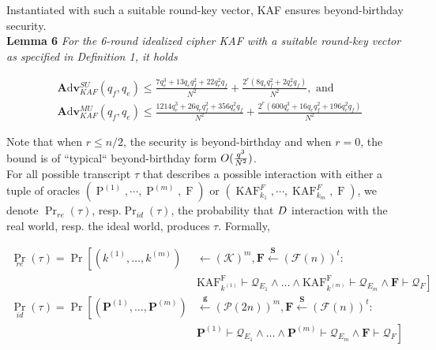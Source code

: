 Instantiated with such a suitable round-key vector, KAF ensures beyond-birthday security.\\

\noindent \textbf{Lemma 6} \emph{For the 6-round idealized cipher KAF with a suitable round-key vector as specified in Definition 1, it holds}

$$
\begin{aligned}
&\mathbf{A} \mathrm{d} \mathbf{v}_{K A F}^{S U}\left(q_{f}, q_{e}\right) \leq \frac{7 q_{e}^{3}+13 q_{e} q_{f}^{2}+22 q_{e}^{2} q_{f}}{N^{2}}+\frac{2^{r}\left(8 q_{e} q_{f}^{2}+2 q_{e}^{2} q_{f}\right)}{N^{2}}, \text { and }\\
&\mathbf{A} \mathrm{d} \mathbf{v}_{K A F}^{M U}\left(q_{f}, q_{e}\right) \leq \frac{1214 q_{e}^{3}+26 q_{e} q_{f}^{2}+356 q_{e}^{2} q_{f}}{N^{2}}+\frac{2^{r}\left(600 q_{e}^{3}+16 q_{e} q_{f}^{2}+196 q_{e}^{2} q_{f}\right)}{N^{2}}
\end{aligned}
$$

Note that when $r \leq n/2$, the security is beyond-birthday and when $r=0$, the bound is of ``typical`` beyond-birthday form $\mathnormal{O}(\frac{q^3}{N^2})$.\\

For all possible transcript $\tau$ that describes a possible interaction with either a tuple of oracles $(\operatorname{P}^{(1)}, \cdots, \operatorname{P}^{(m)},\operatorname{F})$ or $(\operatorname{KAF}^F_{k_1}, \cdots, \operatorname{KAF}^F_{k_m}, \operatorname{F})$, we denote $\operatorname{Pr}_{re}(\tau)$, resp.$\operatorname{Pr}_{id}(\tau)$, the probability that $\mathnormal{D}$  interaction with the real world, resp. the ideal world, produces $\tau$. Formally,

$$
\begin{aligned}
\operatorname{Pr}_{r e}(\tau)=\operatorname{Pr}\left[\left(k^{(1)}, \ldots, k^{(m)}\right)\right.& \leftarrow(\mathcal{K})^{m}, \mathbf{F} \stackrel{\mathbf{S}}{\leftarrow}(\mathcal{F}(n))^{t}: \\
&\left.\mathrm{KAF}_{k^{(1)}}^{\mathrm{F}} \vdash \mathcal{Q}_{E_{1}} \wedge \ldots \wedge \mathrm{K} \mathrm{AF}_{k^{(m)}}^{\mathrm{F}} \vdash \mathcal{Q}_{E_{m}} \wedge \mathbf{F} \vdash \mathcal{Q}_{F}\right]\\
\operatorname{Pr}_{i d}(\tau)=\operatorname{Pr}\left[\left(\mathbf{P}^{(1)}, \ldots, \mathbf{P}^{(m)}\right)\right.& \stackrel{\mathbf{g}}{\leftarrow}(\mathcal{P}(2 n))^{m}, \mathbf{F} \stackrel{\mathbf{S}}{\leftarrow}(\mathcal{F}(n))^{t}: \\
&\left.\mathbf{P}^{(1)} \vdash \mathcal{Q}_{E_{1}} \wedge \ldots \wedge \mathbf{P}^{(m)} \vdash \mathcal{Q}_{E_{m}} \wedge \mathbf{F} \vdash \mathcal{Q}_{F}\right]
\end{aligned}
$$

